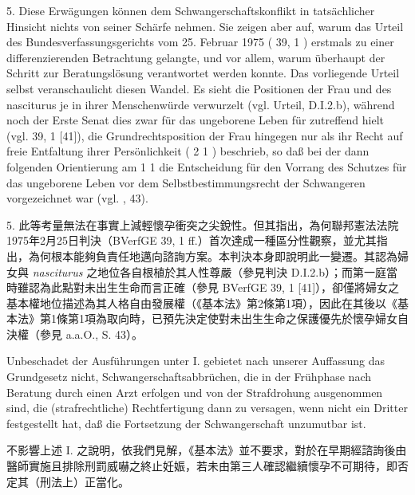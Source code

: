 \documentclass[12pt]{article}
\begin{document}
\begin{sourcepara}[title={原文SondervotumMS.290}]
5. Diese Erwägungen können dem Schwangerschaftskonflikt in tatsächlicher Hinsicht nichts von seiner Schärfe nehmen. Sie zeigen aber auf, warum das Urteil des Bundesverfassungsgerichts vom 25. Februar 1975 (\abbrBVerfGE{} 39, 1 \abbrFF{}) erstmals zu einer differenzierenden Betrachtung gelangte, und vor allem, warum überhaupt der Schritt zur Beratungslösung verantwortet werden konnte. Das vorliegende Urteil selbst veranschaulicht diesen Wandel. Es sieht die Positionen der Frau und des nasciturus je in ihrer Menschenwürde verwurzelt (vgl. Urteil, D.I.2.b), während noch der Erste Senat dies zwar für das ungeborene Leben für zutreffend hielt (vgl. \abbrBVerfGE{} 39, 1 [41]), die Grundrechtsposition der Frau hingegen nur als ihr Recht auf freie Entfaltung ihrer Persönlichkeit (\abbrArt{} 2 \abbrAbs{} 1 \abbrGG{}\ggfnArtTwoOneDE{}) beschrieb, so daß bei der dann folgenden Orientierung am \abbrArt{} 1 \abbrAbs{} 1 \abbrGG{}\ggfnArtOneOneDE{} die Entscheidung für den Vorrang des Schutzes für das ungeborene Leben vor dem Selbstbestimmungsrecht der Schwangeren vorgezeichnet war (vgl. \abbrAAO{}, \abbrS{} 43).
\end{sourcepara}
\begin{transpara}
5. 此等考量無法在事實上減輕懷孕衝突之尖銳性。但其指出，為何聯邦憲法法院1975年2月25日判決（BVerfGE 39, 1 ff.）首次達成一種區分性觀察，並尤其指出，為何根本能夠負責任地邁向諮詢方案。本判決本身即說明此一變遷。其認為婦女與 \textit{nasciturus} 之地位各自根植於其人性尊嚴（參見判決 D.I.2.b）；而第一庭當時雖認為此點對未出生生命而言正確（參見 BVerfGE 39, 1 [41]），卻僅將婦女之基本權地位描述為其人格自由發展權（《基本法》第2條第1項\ggfnArtTwoOneZH{}），因此在其後以《基本法》第1條第1項\ggfnArtOneOneZH{}為取向時，已預先決定使對未出生生命之保護優先於懷孕婦女自決權（參見 a.a.O., S. 43）。
\end{transpara}


\begin{sourcepara}[title={原文SondervotumMS.291}]
Unbeschadet der Ausführungen unter I. gebietet nach unserer Auffassung das Grundgesetz nicht, Schwangerschaftsabbrüchen, die in der Frühphase nach Beratung durch einen Arzt erfolgen und von der Strafdrohung ausgenommen sind, die (strafrechtliche) Rechtfertigung dann zu versagen, wenn nicht ein Dritter festgestellt hat, daß die Fortsetzung der Schwangerschaft unzumutbar ist.
\end{sourcepara}
\begin{transpara}
不影響上述 I. 之說明，依我們見解，《基本法》並不要求，對於在早期經諮詢後由醫師實施且排除刑罰威嚇之終止妊娠，若未由第三人確認繼續懷孕不可期待，即否定其（刑法上）正當化。
\end{transpara}
\end{document}
